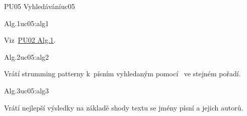 \begin{usecase}{PU05 Vyhledávání}{uc05}
    \begin{scenario}{Alg.1}{uc05:alg1}
        \item Viz~\hyperref[uc02:alg1]{PU02 Alg.1}.
    \end{scenario}

    \begin{scenario}{Alg.2}{uc05:alg2}
        \item Vrátí strumming patterny k~písním vyhledaným pomocí~ ve stejném pořadí.
    \end{scenario}

    \begin{scenario}{Alg.3}{uc05:alg3}
        \item Vrátí nejlepší výsledky na základě shody textu se jmény písní a jejich autorů.
    \end{scenario}
\end{usecase}
